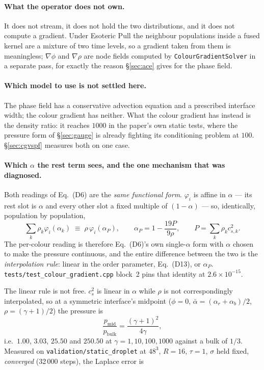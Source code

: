 \documentclass[11pt,a4paper]{article}
\newcommand{\code}[1]{\texttt{\small #1}}
\newcommand{\e}[1]{\times 10^{#1}}
\begin{document}
\paragraph{What the operator does not own.} It does not stream, it does not hold
the two distributions, and it does not compute a gradient. Under Esoteric Pull
the neighbour populations inside a fused kernel are a mixture of two time
levels, so a gradient taken from them is meaningless; $\nabla\phi$ and
$\nabla\rho$ are node fields computed by \code{ColourGradientSolver} in a
separate pass, for exactly the reason \S\ref{sec:ace} gives for the phase field.

\paragraph{Which model to use is not settled here.} The phase field has a
conservative advection equation and a prescribed interface width; the colour
gradient has neither. What the colour gradient has instead is the density ratio:
it reaches $1000$ in the paper's own static tests, where the pressure form of
\S\ref{sec:gauge} is already fighting its conditioning problem at $100$.
\S\ref{sec:cgvspf} measures both on one case.

\paragraph{Which $\alpha$ the rest term sees, and the one mechanism that was
diagnosed.}\label{sec:cgalpha}
Both readings of Eq.~(D6) are the \emph{same functional form}. $\varphi_i$ is
affine in $\alpha$ --- its rest slot is $\alpha$ and every other slot a fixed
multiple of $(1-\alpha)$ --- so, identically, population by population,
\begin{equation}
  \sum_k \rho_k \varphi_i(\alpha_k) \;\equiv\; \rho\, \varphi_i(\alpha_P),
  \qquad \alpha_P = 1 - \frac{19 P}{9\rho}, \qquad P = \sum_k \rho_k c_{s,k}^2 .
\end{equation}
The per-colour reading is therefore Eq.~(D6)'s own single-$\alpha$ form with
$\alpha$ chosen to make the pressure continuous, and the entire difference
between the two is the \emph{interpolation rule}: linear in the order parameter,
Eq.~(D13), or $\alpha_P$. \code{tests/test\_colour\_gradient.cpp} block~2 pins
that identity at $2.6\e{-15}$.

The linear rule is not free. $c_s^2$ is linear in $\alpha$ while $\rho$ is not
correspondingly interpolated, so at a symmetric interface's midpoint
($\phi = 0$, $\bar\alpha = (\alpha_r+\alpha_b)/2$, $\rho = (\gamma+1)/2$) the
pressure is
\begin{equation}
  \frac{p_{\mathrm{mid}}}{p_{\mathrm{bulk}}} = \frac{(\gamma+1)^2}{4\gamma},
\end{equation}
i.e.\ $1.00$, $3.03$, $25.50$ and $250.50$ at $\gamma = 1, 10, 100, 1000$
against a bulk of $1/3$. Measured on \code{validation/static\_droplet} at
$48^3$, $R = 16$, $\tau = 1$, $\sigma$ held fixed, \emph{converged} (32\,000
steps), the Laplace error is
\end{document}
